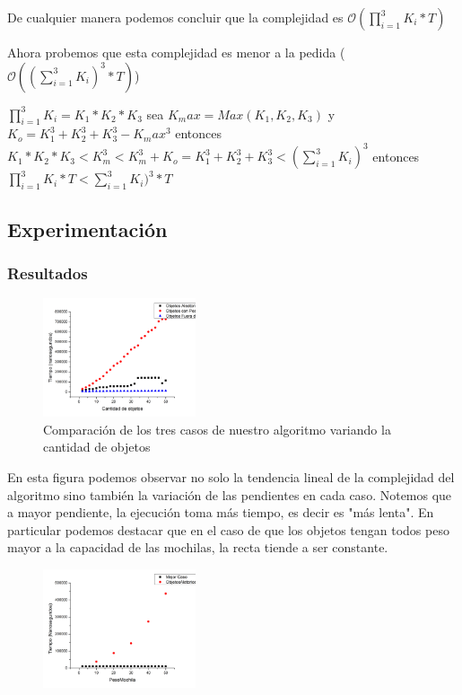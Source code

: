 \documentclass[spanish,12pt]{article}
\begin{document}
De cualquier manera podemos concluir que la complejidad es $\mathcal{O}(\prod_{i=1}^{3}K_{i} * T)$

Ahora probemos que esta complejidad es menor a la pedida ($\mathcal{O}((\sum_{i=1}^{3}K_{i})^{3} * T)$)

$\prod_{i=1}^{3}K_{i}  = K_1*K_2*K_3$   sea $K_max = Max(K_1,K_2,K_3)$ y $K_o= K_1^3 + K_2^3 + K_3^3 - K_max^3$ entonces $K_1*K_2*K_3 < K_m^3 < K_m^3 + K_o = K_1^3+K_2^3+K_3^3 <(\sum_{i=1}^{3}K_{i})^{3}$ entonces $\prod_{i=1}^{3}K_{i}* T < \sum_{i=1}^{3}K_{i})^{3} * T $


\subsection{Experimentación}

\subsubsection{Resultados}

\begin{figure}[H]
\centering
\includegraphics[width=0.4\textwidth]{comparacionObjetos}
\caption{Comparación de los tres casos de nuestro algoritmo variando la cantidad de objetos}
\end{figure}

En esta figura podemos observar no solo la tendencia lineal de la complejidad del algoritmo sino también la variación de las pendientes en cada caso. Notemos que a mayor pendiente, la ejecución toma más tiempo, es decir	 es "más lenta".
En particular podemos destacar que en el caso de que los objetos tengan todos peso mayor a la capacidad de las mochilas, la recta tiende a ser constante.

\begin{figure}[H]
\centering
\includegraphics[width=0.4\textwidth]{pesoMCvsObjAl}
\caption{}
\end{figure}
\end{document}
